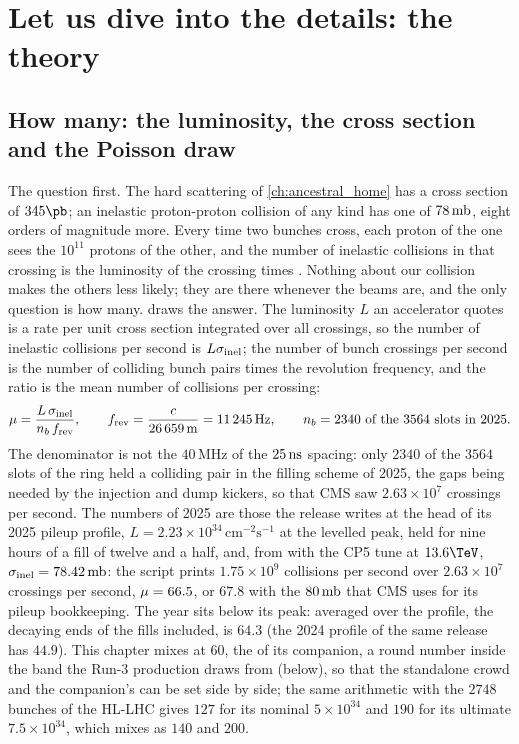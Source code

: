 \section{Let us dive into the details: the theory}
\label{sec:crowd_on_the_road:theory}

\subsection{How many: the luminosity, the cross section and the Poisson draw}
\label{sec:crowd_on_the_road:forty_families_at_once_what_pileup_is_an}

The question first. The hard scattering of \cref{ch:ancestral_home} has a
cross section of $345\pb$; an inelastic proton-proton collision of any
kind has one of $78\,\mathrm{mb}$, eight orders of magnitude more. Every time
two bunches cross, each proton of the one sees the $10^{11}$ protons of
the other, and the number of inelastic collisions in that crossing is
the luminosity of the crossing times \sigmainel. Nothing about our
collision makes the others less likely; they are there whenever the
beams are, and the only question is how many.
 draws the answer. The luminosity
$L$ an accelerator quotes is a rate per unit cross section integrated
over all crossings, so the number of inelastic collisions per second is
$L\sigma_{\mathrm{inel}}$; the number of bunch crossings per second is the number of
colliding bunch pairs times the revolution frequency, and the ratio is
the mean number of collisions per crossing:
\begin{equation}
  \mu=\frac{L\,\sigma_{\mathrm{inel}}}{n_b\,f_{\mathrm{rev}}},\qquad
  f_{\mathrm{rev}}=\frac{c}{26\,659\,\mathrm{m}}=11\,245\,\mathrm{Hz},\qquad
  n_b=2340\ \text{of the }3564\text{ slots in }2025.
  \label{eq:crowd_on_the_road:mu}
\end{equation}
The denominator is not the $40\,\mathrm{MHz}$ of the $25\,\mathrm{ns}$ spacing:
only $2340$ of the $3564$ slots of the ring held a colliding pair in the
filling scheme of 2025, the gaps being needed by the injection and dump
kickers, so that CMS saw $2.63\times10^{7}$ crossings per second. The
numbers of 2025 are those the release writes at the head of its 2025
pileup profile, $L=2.23\times10^{34}\,\mathrm{cm^{-2}s^{-1}}$ at the
levelled peak, held for nine hours of a fill of twelve and a half, and,
from \PYTHIA with the CP5 tune at $13.6\TeV$, $\sigma_{\mathrm{inel}}=78.42\,\mathrm{mb}$:
the script prints $1.75\times10^{9}$ collisions per second over
$2.63\times10^{7}$ crossings per second, $\mu=66.5$, or $67.8$ with the
$80\,\mathrm{mb}$ that CMS uses for its pileup bookkeeping. The year sits below
its peak: averaged over the profile, the decaying ends of the fills
included, \mup is $64.3$ (the 2024 profile of the same release has
$44.9$). This chapter mixes at $60$, the  of its
\CMSSW companion, a round number inside the band the Run-3 production
draws from (below), so that the standalone crowd and the companion's can
be set side by side; the same arithmetic with the $2748$ bunches of the HL-LHC gives $127$ for
its nominal $5\times10^{34}$ and $190$ for its ultimate $7.5\times10^{34}$,
which \CMSSW mixes as $140$ and $200$.

